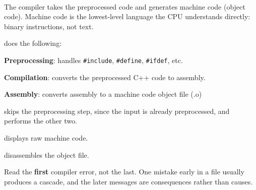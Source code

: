 \documentclass[
    10pt,
    dvipsnames,
    svgnames,
    x11names,
    aspectratio=1610,
    english,
    codeminted]{beamer}
\begin{document}
\begin{frame}[fragile]{\secname}
\framesubtitle{\subsecname}
The compiler takes the preprocessed code and generates machine code (object code). Machine code is the lowest-level language the CPU understands directly: binary instructions, not text.

\begin{compactitem}
\small
    \item {} does the following:
    \begin{compactitem}
    \small
        \item \textbf{Preprocessing}: handles \texttt{#include}, \texttt{#define}, \texttt{#ifdef}, etc.
        \item \textbf{Compilation}: converts the preprocessed C++ code to assembly.
        \item \textbf{Assembly}: converts assembly to a machine code object file (.o)
    \end{compactitem}
    \item {} skips the preprocessing step, since the input is already preprocessed, and performs the other two.
    \item {} displays raw machine code.
    \item {} disassembles the object file.
\end{compactitem}

\medskip
\begin{MyBox}
Read the \textbf{first} compiler error, not the last. One mistake early in a file usually produces a cascade, and the later messages are consequences rather than causes.
\end{MyBox}
\end{frame}
\end{document}
